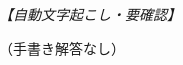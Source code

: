 \documentclass[../../main.tex]{subfiles}
\begin{document}
\begin{oframed}
  
\end{oframed}

\begin{flushright}
  \footnotesize\textit{【自動文字起こし・要確認】}
\end{flushright}

（手書き解答なし）

\newpage
\end{document}
